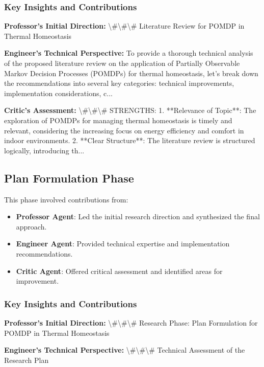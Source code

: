 \documentclass[11pt,a4paper]{article}
\begin{document}
\subsubsection{Key Insights and Contributions}


\textbf{Professor's Initial Direction:} \textbackslash{}#\textbackslash{}#\textbackslash{}# Literature Review for POMDP in Thermal Homeostasis


\textbf{Engineer's Technical Perspective:} To provide a thorough technical analysis of the proposed literature review on the application of Partially Observable Markov Decision Processes (POMDPs) for thermal homeostasis, let's break down the recommendations into several key categories: technical improvements, implementation considerations, c...


\textbf{Critic's Assessment:} \textbackslash{}#\textbackslash{}#\textbackslash{}# STRENGTHS:
1. **Relevance of Topic**: The exploration of POMDPs for managing thermal homeostasis is timely and relevant, considering the increasing focus on energy efficiency and comfort in indoor environments.
2. **Clear Structure**: The literature review is structured logically, introducing th...


\subsection{Plan Formulation Phase}


This phase involved contributions from:

\begin{itemize}
\item \textbf{Professor Agent}: Led the initial research direction and synthesized the final approach.
\item \textbf{Engineer Agent}: Provided technical expertise and implementation recommendations.
\item \textbf{Critic Agent}: Offered critical assessment and identified areas for improvement.
\end{itemize}

\subsubsection{Key Insights and Contributions}


\textbf{Professor's Initial Direction:} \textbackslash{}#\textbackslash{}#\textbackslash{}# Research Phase: Plan Formulation for POMDP in Thermal Homeostasis


\textbf{Engineer's Technical Perspective:} \textbackslash{}#\textbackslash{}#\textbackslash{}# Technical Assessment of the Research Plan
\end{document}
